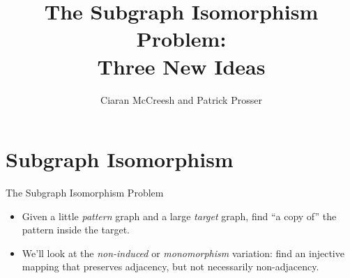\documentclass{beamer}
\title[The Subgraph Isomorphism Problem: Three New Ideas]{The Subgraph Isomorphism Problem: \\ Three New Ideas}
\author[Ciaran McCreesh]{\textcolor{uofgblue}{Ciaran McCreesh} and Patrick Prosser}
\begin{document}
{
    \begin{frame}
        \titlepage
    \end{frame}
}

\section{Subgraph Isomorphism}

\begin{frame}{The Subgraph Isomorphism Problem}

    \begin{itemize}
        \item Given a little \emph{pattern} graph and a large \emph{target} graph, find ``a copy
            of'' the pattern inside the target.

        \item We'll look at the \emph{non-induced} or \emph{monomorphism} variation: find an
            injective mapping that preserves adjacency, but not necessarily non-adjacency.
    \end{itemize}

\end{frame}
\end{document}
